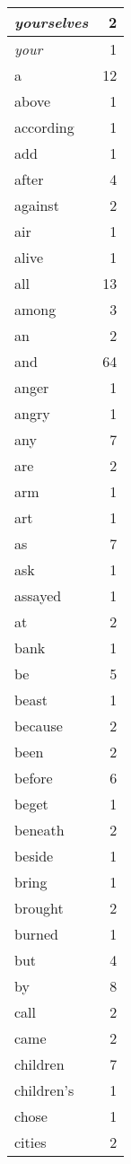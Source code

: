 \begin{center}
\begin{longtable}{l|r}
\emph{yourselves} & 2 \\ \hline
\emph{your} & 1 \\ \hline
a & 12 \\ \hline
above & 1 \\ \hline
according & 1 \\ \hline
add & 1 \\ \hline
after & 4 \\ \hline
against & 2 \\ \hline
air & 1 \\ \hline
alive & 1 \\ \hline
all & 13 \\ \hline
among & 3 \\ \hline
an & 2 \\ \hline
and & 64 \\ \hline
anger & 1 \\ \hline
angry & 1 \\ \hline
any & 7 \\ \hline
are & 2 \\ \hline
arm & 1 \\ \hline
art & 1 \\ \hline
as & 7 \\ \hline
ask & 1 \\ \hline
assayed & 1 \\ \hline
at & 2 \\ \hline
bank & 1 \\ \hline
be & 5 \\ \hline
beast & 1 \\ \hline
because & 2 \\ \hline
been & 2 \\ \hline
before & 6 \\ \hline
beget & 1 \\ \hline
beneath & 2 \\ \hline
beside & 1 \\ \hline
bring & 1 \\ \hline
brought & 2 \\ \hline
burned & 1 \\ \hline
but & 4 \\ \hline
by & 8 \\ \hline
call & 2 \\ \hline
came & 2 \\ \hline
children & 7 \\ \hline
children's & 1 \\ \hline
chose & 1 \\ \hline
cities & 2 \\ \hline

\end{longtable}
\end{center}
